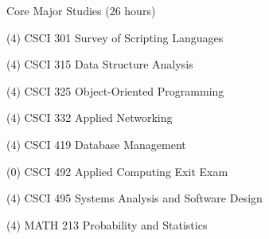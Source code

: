 \begin{reqgroup}{Core Major Studies (26 hours)}
\begin{checklist}
\begin{minipage}{0.5\linewidth}
	\item (4) CSCI 301	Survey of Scripting Languages
	\item (4) CSCI 315	Data Structure Analysis
	\item (4) CSCI 325	Object-Oriented Programming
	\item (4) CSCI 332	Applied Networking
\end{minipage}
\begin{minipage}{0.5\linewidth}
	\item (4) CSCI 419	Database Management
	\item (0) CSCI 492	Applied Computing Exit Exam
	\item (4) CSCI 495	Systems Analysis and Software Design
	\item (4) MATH 213	Probability and Statistics
	\end{minipage}
\end{checklist}
\end{reqgroup}

